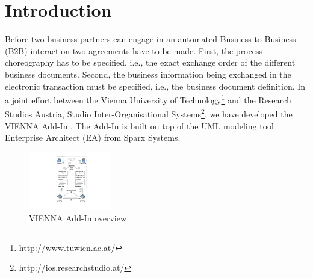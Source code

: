 \documentclass{acm_proc_article-sp}
\begin{document}
\section{Introduction}
Before two business partners can engage in an automated Business-to-Business (B2B) interaction two agreements have to be made. First, the process choreography has to be specified, i.e., the exact exchange order of the different business documents. Second, the business information being exchanged in the electronic transaction must be specified, i.e., the business document definition. In a joint effort between the Vienna University of Technology\footnote{http://www.tuwien.ac.at/} and the Research Studios Austria, Studio Inter-Organisational Systems\footnote{http://ios.researchstudio.at/}, we have developed the VIENNA Add-In \cite{man:VIENNAAddIn}. The Add-In is built on top of the UML modeling tool Enterprise Architect (EA) from Sparx Systems. %
\begin{figure}
 \centering
   \includegraphics[width=0.32\textwidth]{figures/addinoverview.pdf}
 \caption{VIENNA Add-In overview}
 \label{fig:viennaaddinoverview}
\end{figure}
\end{document}
